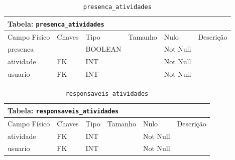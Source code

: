 \documentclass[12pt,a4paper]{article}
\begin{document}
\begin{center}
\begin{table}[h!]
	\caption{\texttt{presenca\_atividades}}
	\label{tabela:presencaAtividades}
	\begin{tabular}{|p{2.5cm}|p{1cm}|p{1.25cm}|p{1.75cm}|p{1.25cm}|p{5cm}|}\hline	
		\multicolumn{6}{|p{16cm}|}{\cellcolor{cinzaClaro}  \centering Tabela: \texttt{presenca\_atividades}} \\ \hline %
		{\small Campo Físico}   & {\small Chaves} & {\small Tipo} & {\small Tamanho} & {\small Nulo} & {\small Descrição}\\\hline %
		
		{\tiny presenca} & {\tiny } & {\tiny BOOLEAN} & {\tiny } & {\tiny Not Null} &{\tiny }\\\hline
		{\tiny atividade}  & {\tiny FK} & {\tiny INT} & {\tiny } & {\tiny Not Null} &{\tiny }\\\hline
		{\tiny usuario}  & {\tiny FK} & {\tiny INT} & {\tiny } & {\tiny Not Null} &{\tiny }\\\hline
			
	\end{tabular}
\end{table}	
\end{center}


\begin{center}
\begin{table}[h!]
	\caption{\texttt{responsaveis\_atividades}}
	\label{tabela:responsaveisAtividades}
	\begin{tabular}{|p{2.5cm}|p{1cm}|p{1.25cm}|p{1.75cm}|p{1.25cm}|p{5cm}|}\hline	
		\multicolumn{6}{|p{16cm}|}{\cellcolor{cinzaClaro}  \centering Tabela: \texttt{responsaveis\_atividades}} \\ \hline %
		{\small Campo Físico}   & {\small Chaves} & {\small Tipo} & {\small Tamanho} & {\small Nulo} & {\small Descrição}\\\hline %
		
		{\tiny atividade}  & {\tiny FK} & {\tiny INT} & {\tiny } & {\tiny Not Null} &{\tiny }\\\hline
		{\tiny usuario} & {\tiny FK} & {\tiny INT} & {\tiny } & {\tiny Not Null} &{\tiny }\\\hline
			
	\end{tabular}
\end{table}	
\end{center}
\end{document}
